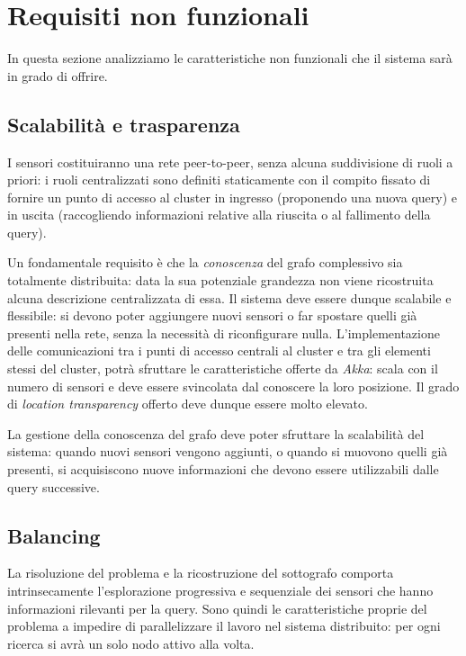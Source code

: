 \documentclass{llncs}
\begin{document}
\section{Requisiti non funzionali}
\label{sec:nonfunc-req}

In questa sezione analizziamo le caratteristiche non funzionali
che il sistema sarà in grado di offrire.

\subsection{Scalabilità e trasparenza}
I sensori costituiranno una rete peer-to-peer,
senza alcuna suddivisione di ruoli a priori: i ruoli centralizzati
sono definiti staticamente con il compito fissato di fornire un punto
di accesso al cluster in ingresso (proponendo una nuova query) e
in uscita (raccogliendo informazioni relative alla riuscita
o al fallimento della query).

Un fondamentale requisito è che
la \emph{conoscenza} del grafo complessivo sia totalmente distribuita:
data la sua potenziale grandezza
non viene ricostruita alcuna descrizione centralizzata di essa.
Il sistema deve essere dunque scalabile e flessibile:
si devono poter aggiungere nuovi sensori o far spostare
quelli già presenti nella rete, senza la necessità di riconfigurare nulla.
L'implementazione delle
comunicazioni tra i punti di accesso centrali al cluster e
tra gli elementi stessi del cluster, potrà
sfruttare le caratteristiche offerte da \emph{Akka}:
scala con il numero di sensori e
deve essere svincolata dal conoscere la loro posizione.
Il grado di \emph{location transparency} offerto deve dunque essere molto elevato.

La gestione della conoscenza del grafo deve poter
sfruttare la scalabilità del sistema: quando nuovi sensori vengono
aggiunti, o quando si muovono quelli già presenti, si acquisiscono
nuove informazioni che devono essere utilizzabili dalle query successive.

\subsection{Balancing}
La risoluzione del problema e la ricostruzione del sottografo
comporta intrinsecamente l'esplorazione progressiva e sequenziale
dei sensori che hanno informazioni rilevanti per la query.
Sono quindi le caratteristiche proprie del problema a impedire di
parallelizzare il lavoro nel sistema distribuito:
per ogni ricerca si avrà un solo nodo attivo alla volta.
\end{document}
